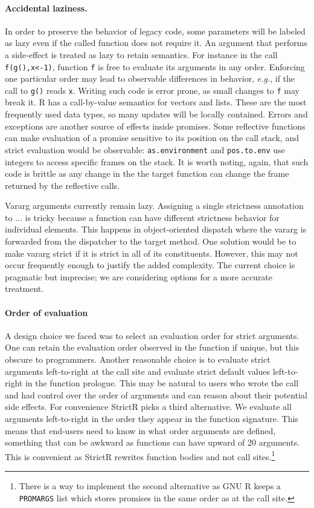 \documentclass[review,creen,acmsmall]{acmart}
\renewcommand{\c}[1]{\lstinline |#1|\xspace}
\newcommand{\strictr}{{\sf StrictR}\xspace}
\newcommand{\eg}{\emph{e.g.},\xspace}
\begin{document}
\paragraph{Accidental laziness.} In order to preserve the behavior of legacy
code, some parameters will be labeled as lazy even if the called function does
not require it. An argument that performs a side-effect is treated as lazy to
retain semantics. For instance in the call \c{f(g(),x<-1)}, function \c f is
free to evaluate its arguments in any order. Enforcing one particular order may
lead to observable differences in behavior, \eg if the call to \c{g()} reads
\c{x}. Writing such code is error prone, as small changes to \c f may break it.
R has a call-by-value semantics for vectors and lists. These are the most
frequently used data types, so many updates will be locally contained. Errors
and exceptions are another source of effects inside promises. Some reflective
functions can make evaluation of a promise sensitive to its position on the call
stack, and strict evaluation would be observable: \c{as.environment} and
\c{pos.to.env} use integers to access specific frames on the stack. It is
worth noting, again, that such code is brittle as any change in the the target
function can change the frame returned by the reflective calls.

Vararg arguments currently remain lazy. Assigning a single strictness annotation
to $\dots$ is tricky because a function can have different strictness behavior
for individual elements. This happens in object-oriented dispatch where the
vararg is forwarded from the dispatcher to the target method. One solution would
be to make vararg strict if it is strict in all of its constituents. However,
this may not occur frequently enough to justify the added complexity. The
current choice is pragmatic but imprecise; we are considering options for a more
accurate treatment.


\paragraph{Order of evaluation} A design choice we faced
was to select an evaluation order for strict arguments. One can retain the
evaluation order observed in the function if unique, but this obscure to
programmers. Another reasonable choice is to evaluate strict arguments
left-to-right at the call site and evaluate strict default values left-to-right
in the function prologue. This may be natural to users who wrote the call and
had control over the order of arguments and can reason about their potential
side effects. For convenience \strictr picks a third alternative. We evaluate
all arguments left-to-right in the order they appear in the function signature.
This means that end-users need to know in what order arguments are defined,
something that can be awkward as functions can have upward of 20 arguments. This
is convenient as \strictr rewrites function bodies and not call
sites.\footnote{There is a way to implement the second alternative as GNU R
keeps a \c{PROMARGS} list which stores promises in the same order as at the call
site.}
\end{document}
